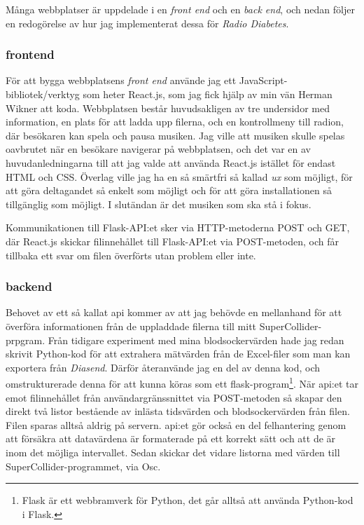 \documentclass[11pt, a4paper]{article} %
\begin{document}
Många webbplatser är uppdelade i en \emph{front end} och en \emph{back end}, och nedan följer en redogörelse av hur jag implementerat dessa för \emph{Radio Diabetes}. 

\subsubsection*{\gls{frontend}}
För att bygga webbplatsens \emph{front end} använde jag ett JavaScript-bibliotek/verktyg som heter React.js, som jag fick hjälp av min vän Herman Wikner att koda. Webbplatsen består huvudsakligen av tre undersidor med information, en plats för att ladda upp filerna, och en kontrollmeny till radion, där besökaren kan spela och pausa musiken. Jag ville att musiken skulle spelas oavbrutet när en besökare navigerar på webbplatsen, och det var en av huvudanledningarna till att jag valde att använda React.js istället för endast HTML och CSS. Överlag ville jag ha en så smärtfri så kallad \emph{\gls{ux}} som möjligt, för att göra deltagandet så enkelt som möjligt och för att göra installationen så tillgänglig som möjligt. I slutändan är det musiken som ska stå i fokus.

Kommunikationen till Flask-API:et sker via HTTP-metoderna POST och GET, där React.js skickar filinnehållet till Flask-API:et via POST-metoden, och får tillbaka ett svar om filen överförts utan problem eller inte.



\subsubsection*{\gls{backend}}
Behovet av ett så kallat \gls{api} kommer av att jag behövde en mellanhand för att överföra informationen från de uppladdade filerna till mitt SuperCollider-prpgram. Från tidigare experiment med mina blodsockervärden hade jag redan skrivit Python-kod för att extrahera mätvärden från de Excel-filer som man kan exportera från \emph{Diasend}. Därför återanvände jag en del av denna kod, och omstrukturerade denna för att kunna köras som ett \gls{flask}-program\footnote{Flask är ett webbramverk för Python, det går alltså att använda Python-kod i Flask.}. När \gls{api}:et tar emot filinnehållet från användargränssnittet via POST-metoden så skapar den direkt två listor bestående av inlästa tidsvärden och blodsockervärden från filen. Filen sparas alltså aldrig på servern. \gls{api}:et gör också en del felhantering genom att försäkra att datavärdena är formaterade på ett korrekt sätt och att de är inom det möjliga intervallet. Sedan skickar det vidare listorna med värden till SuperCollider-programmet, via Osc. 
\end{document}

